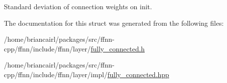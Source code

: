 Standard deviation of connection weights on init. 



The documentation for this struct was generated from the following files\-:\begin{DoxyCompactItemize}
\item 
/home/briancairl/packages/src/ffnn-\/cpp/ffnn/include/ffnn/layer/\hyperlink{fully__connected_8h}{fully\-\_\-connected.\-h}\item 
/home/briancairl/packages/src/ffnn-\/cpp/ffnn/include/ffnn/layer/impl/\hyperlink{layer_2impl_2fully__connected_8hpp}{fully\-\_\-connected.\-hpp}\end{DoxyCompactItemize}
